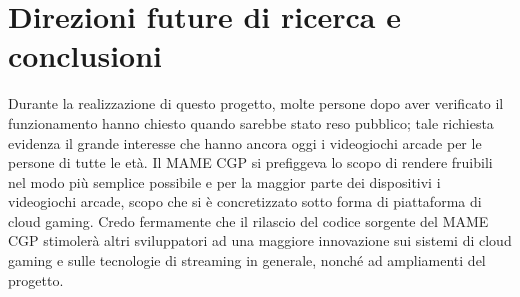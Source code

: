 %
%

\chapter*{Direzioni future di ricerca e conclusioni}


Durante la realizzazione di questo progetto, molte persone dopo aver verificato il funzionamento hanno chiesto quando sarebbe stato reso pubblico; tale richiesta evidenza il grande interesse che hanno ancora oggi i videogiochi arcade per le persone di tutte le età. Il MAME CGP si prefiggeva lo scopo di rendere fruibili nel modo più semplice possibile e per la maggior parte dei dispositivi i videogiochi arcade, scopo che si è concretizzato sotto forma di piattaforma di cloud gaming. Credo fermamente che il rilascio del codice sorgente del MAME CGP stimolerà altri sviluppatori ad una maggiore innovazione sui sistemi di cloud gaming e sulle tecnologie di streaming in generale, nonché ad ampliamenti del progetto.

